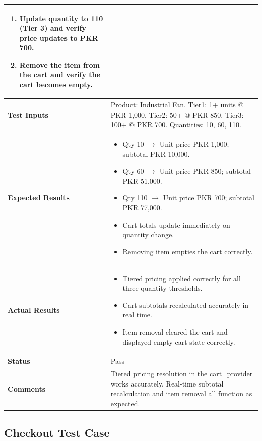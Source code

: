 \begin{table}[H]
\begin{tabular}{|p{3.2cm}|p{10.8cm}|}
\begin{enumerate}[leftmargin=*,noitemsep]
\item Update quantity to 110 (Tier 3) and verify price updates to PKR 700.
\item Remove the item from the cart and verify the cart becomes empty.
\end{enumerate} \\ \hline
\textbf{Test Inputs} & Product: Industrial Fan. Tier1: 1+ units @ PKR 1,000. Tier2: 50+ @ PKR 850. Tier3: 100+ @ PKR 700. Quantities: 10, 60, 110. \\ \hline
\textbf{Expected Results} &
\begin{itemize}[leftmargin=*,noitemsep]
\item Qty 10 $\rightarrow$ Unit price PKR 1,000; subtotal PKR 10,000.
\item Qty 60 $\rightarrow$ Unit price PKR 850; subtotal PKR 51,000.
\item Qty 110 $\rightarrow$ Unit price PKR 700; subtotal PKR 77,000.
\item Cart totals update immediately on quantity change.
\item Removing item empties the cart correctly.
\end{itemize} \\ \hline
\textbf{Actual Results} &
\begin{itemize}[leftmargin=*,noitemsep]
\item Tiered pricing applied correctly for all three quantity thresholds.
\item Cart subtotals recalculated accurately in real time.
\item Item removal cleared the cart and displayed empty-cart state correctly.
\end{itemize} \\ \hline
\textbf{Status} & Pass \\ \hline
\textbf{Comments} & Tiered pricing resolution in the cart\_provider works accurately. Real-time subtotal recalculation and item removal all function as expected. \\ \hline
\end{tabular}
\end{table}

\subsection{Checkout Test Case}

